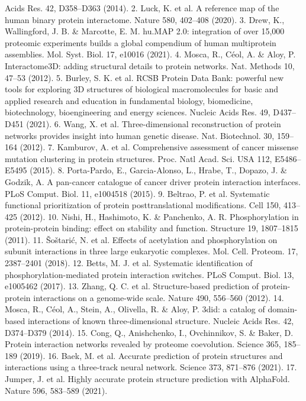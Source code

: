 Acids Res. 42, D358–D363 (2014).
2.
Luck, K. et al. A reference map of the human binary protein
interactome. Nature 580, 402–408 (2020).
3.
Drew, K., Wallingford, J. B. \& Marcotte, E. M. hu.MAP 2.0:
integration of over 15,000 proteomic experiments builds a global
compendium of human multiprotein assemblies. Mol. Syst. Biol.
17, e10016 (2021).
4.
Mosca, R., Céol, A. \& Aloy, P. Interactome3D: adding structural
details to protein networks. Nat. Methods 10, 47–53 (2012).
5.
Burley, S. K. et al. RCSB Protein Data Bank: powerful new tools
for exploring 3D structures of biological macromolecules for
basic and applied research and education in fundamental
biology, biomedicine, biotechnology, bioengineering and energy
sciences. Nucleic Acids Res. 49, D437–D451 (2021).
6.
Wang, X. et al. Three-dimensional reconstruction of protein
networks provides insight into human genetic disease. Nat.
Biotechnol. 30, 159–164 (2012).
7.
Kamburov, A. et al. Comprehensive assessment of cancer
missense mutation clustering in protein structures. Proc. Natl
Acad. Sci. USA 112, E5486–E5495 (2015).
8.
Porta-Pardo, E., Garcia-Alonso, L., Hrabe, T., Dopazo, J. \& Godzik,
A. A pan-cancer catalogue of cancer driver protein interaction
interfaces. PLoS Comput. Biol. 11, e1004518 (2015).
9.
Beltrao, P. et al. Systematic functional prioritization of protein
posttranslational modifications. Cell 150, 413–425 (2012).
10.	 Nishi, H., Hashimoto, K. \& Panchenko, A. R. Phosphorylation in
protein-protein binding: effect on stability and function. Structure
19, 1807–1815 (2011).
11.
Šoštarić, N. et al. Effects of acetylation and phosphorylation on
subunit interactions in three large eukaryotic complexes. Mol.
Cell. Proteom. 17, 2387–2401 (2018).
12.	 Betts, M. J. et al. Systematic identification of
phosphorylation-mediated protein interaction switches.
PLoS Comput. Biol. 13, e1005462 (2017).
13.	 Zhang, Q. C. et al. Structure-based prediction of protein-
protein interactions on a genome-wide scale. Nature 490,
556–560 (2012).
14.	 Mosca, R., Céol, A., Stein, A., Olivella, R. \& Aloy, P. 3did: a catalog
of domain-based interactions of known three-dimensional
structure. Nucleic Acids Res. 42, D374–D379 (2014).
15.	 Cong, Q., Anishchenko, I., Ovchinnikov, S. \& Baker, D. Protein
interaction networks revealed by proteome coevolution. Science
365, 185–189 (2019).
16.	 Baek, M. et al. Accurate prediction of protein structures and
interactions using a three-track neural network. Science 373,
871–876 (2021).
17.	 Jumper, J. et al. Highly accurate protein structure prediction with
AlphaFold. Nature 596, 583–589 (2021).
